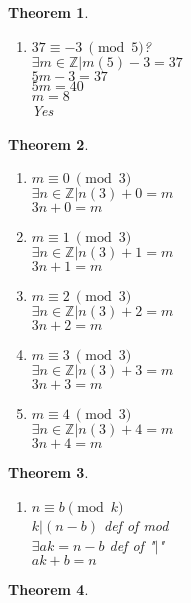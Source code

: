 \documentclass{article}
\newtheorem{theorem}{Theorem}[section]
\begin{document}
\begin{theorem}
\begin{enumerate}
			No
		\item[4]
			$37 \equiv -3~\pmod{5}$?\\
			$\exists m \in \mathbb{Z}|m(5) - 3 = 37$\\
			$5m - 3 = 37$\\
			$5m = 40$\\
			$m = 8$\\
			Yes
	\end{enumerate}
\end{theorem}\begin{theorem}
	\begin{enumerate}
		\item[1]
			$m \equiv 0~\pmod{3}$\\
			$\exists n \in \mathbb{Z}|n(3) + 0 = m$\\
			$3n + 0 = m$\\
		\item[2]
			$m \equiv 1~\pmod{3}$\\
			$\exists n \in \mathbb{Z}|n(3) + 1 = m$\\
			$3n + 1 = m$\\
		\item[3]
			$m \equiv 2~\pmod{3}$\\
			$\exists n \in \mathbb{Z}|n(3) + 2 = m$\\
			$3n + 2 = m$\\
		\item[4]
			$m \equiv 3~\pmod{3}$\\
			$\exists n \in \mathbb{Z}|n(3) + 3 = m$\\
			$3n + 3 = m$\\
		\item[5]
			$m \equiv 4~\pmod{3}$\\
			$\exists n \in \mathbb{Z}|n(3) + 4 = m$\\
			$3n + 4 = m$\\
	\end{enumerate}
\end{theorem}\begin{theorem}
	\begin{enumerate}
		\item[1]
			$n \equiv b \pmod{k}$\\
			$k|(n-b)$ def of mod\\
			$\exists ak = n-b$ def of "$|$"\\
			$ak+b=n$\\
	\end{enumerate}
\end{theorem}\begin{theorem}

\end{theorem}
\end{document}
